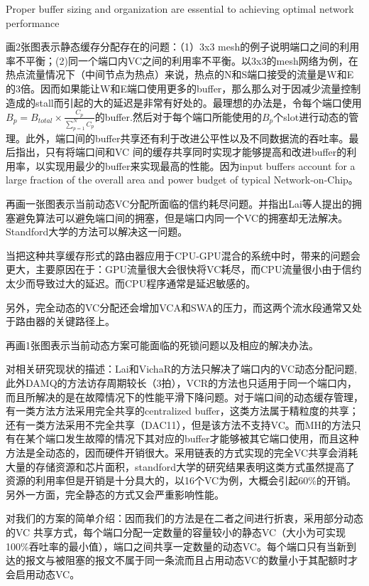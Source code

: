 \documentclass[10pt,journal]{IEEEtran}
\begin{document}
Proper buffer sizing and organization are essential to achieving optimal network performance

画2张图表示静态缓存分配存在的问题：（1）3x3 mesh的例子说明端口之间的利用率不平衡；(2)同一个端口内VC之间的利用率不平衡。以3x3的mesh网络为例，在热点流量情况下（中间节点为热点）来说，热点的N和S端口接受的流量是W和E的3倍。因而如果能让W和E端口使用更多的buffer，那么那么对于因减少流量控制造成的stall而引起的大的延迟是非常有好处的。最理想的办法是，令每个端口使用$B_p=B_{total}\times\frac{C_p}{\sum_{p=1}^NC_p}$的buffer.然后对于每个端口所能使用的$B_p$个slot进行动态的管理。此外，端口间的buffer共享还有利于改进公平性以及不同数据流的吞吐率。最后指出，只有将端口间和VC 间的缓存共享同时实现才能够提高和改进buffer的利用率，以实现用最少的buffer来实现最高的性能。因为input buffers account for a large fraction of the overall area and power budget of typical Network-on-Chip。

再画一张图表示当前动态VC分配所面临的信约耗尽问题。并指出Lai等人提出的拥塞避免算法可以避免端口间的拥塞，但是端口内同一个VC的拥塞却无法解决。Standford大学的方法可以解决这一问题。

当把这种共享缓存形式的路由器应用于CPU-GPU混合的系统中时，带来的问题会更大，主要原因在于：GPU流量很大会很快将VC耗尽，而CPU流量很小由于信约太少而导致过大的延迟。而CPU程序通常是延迟敏感的。

另外，完全动态的VC分配还会增加VCA和SWA的压力，而这两个流水段通常又处于路由器的关键路径上。

再画1张图表示当前动态方案可能面临的死锁问题以及相应的解决办法。

对相关研究现状的描述：Lai和VichaR的方法只解决了端口内的VC动态分配问题,此外DAMQ的方法访存周期较长（3拍），VCR的方法也只适用于同一个端口内，而且所解决的是在故障情况下的性能平滑下降问题。对于端口间的动态缓存管理，有一类方法方法采用完全共享的centralized buffer，这类方法属于精粒度的共享；还有一类方法采用不完全共享（DAC11），但是该方法不支持VC。而MH的方法只有在某个端口发生故障的情况下其对应的buffer才能够被其它端口使用，而且这种方法是全动态的，因而硬件开销很大。采用链表的方式实现的完全VC共享会消耗大量的存储资源和芯片面积，standford大学的研究结果表明这类方式虽然提高了资源的利用率但是开销是十分具大的，以16个VC为例，大概会引起60\%的开销。另外一方面，完全静态的方式又会严重影响性能。

对我们的方案的简单介绍：因而我们的方法是在二者之间进行折衷，采用部分动态的VC 共享方式，每个端口分配一定数量的容量较小的静态VC（大小为可实现100\%吞吐率的最小值），端口之间共享一定数量的动态VC。每个端口只有当新到达的报文与被阻塞的报文不属于同一条流而且占用动态VC的数量小于其配额时才会启用动态VC。
\end{document}
